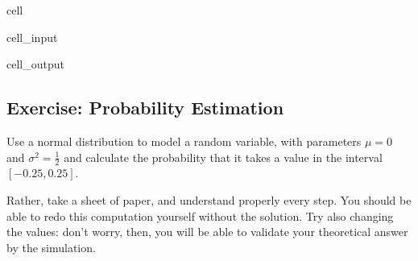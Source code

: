 \documentclass[letterpaper,10pt,english]{jupyterBook}
\begin{document}
\begin{sphinxuseclass}{cell}
\begin{sphinxVerbatimInput}
\begin{sphinxuseclass}{cell_input}
\end{sphinxuseclass}\end{sphinxVerbatimInput}
\begin{sphinxVerbatimOutput}

\begin{sphinxuseclass}{cell_output}
\noindent{}

\end{sphinxuseclass}\end{sphinxVerbatimOutput}

\end{sphinxuseclass}

\subsection{Exercise: Probability Estimation}
\label{\detokenize{01:exercise-probability-estimation}}
\sphinxAtStartPar
Use a normal distribution to model a random variable, with parameters \(\mu = 0\) and \(\sigma^2 = \frac12\) and calculate the probability that it takes a value in the interval \([-0.25, 0.25]\).

\begin{sphinxShadowBox}
\sphinxstylesidebartitle{}

\sphinxAtStartPar
{} Rather, take a sheet of paper, and understand properly every step. You should be able to redo this computation yourself without the solution. Try also changing the values: don’t worry, then, you will be able to validate your theoretical answer by the simulation.
\end{sphinxShadowBox}
\end{document}
